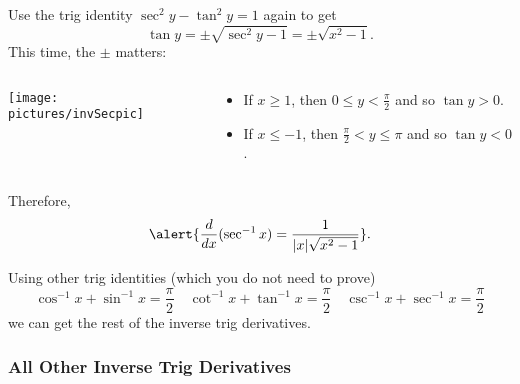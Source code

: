 \documentclass[cal1spr16Lectures.tex]{subfiles}
\begin{document}
\begin{frame}\footnotesize
Use the trig identity $\sec^2 y-\tan^2 y=1$ again to get 
\[\tan y=\pm\sqrt{\sec^2 y-1}=\pm\sqrt{x^2-1}.\]
This time, the $\pm$ matters:
\vspace{-1.1pc}
\begin{columns}
\begin{column}{0.3\textwidth}
	\begin{center}\texttt{[image: pictures/invSecpic]}\end{center}
\end{column}
\begin{column}{0.6\textwidth}
	\begin{itemize}
	\item If $x \ge 1$, then $0\leq y<\textstyle\frac{\pi}{2}$ and so $\tan y >0.$  
	\item If $x \le -1$, then $\textstyle\frac{\pi}{2} < y \leq \pi$ and so  $\tan y <0$.  
	\end{itemize}
\end{column}
\end{columns}	
\end{frame}

\begin{frame}\footnotesize
Therefore,
\[\alert{\frac{d}{dx}(\sec^{-1} x)=\frac{1}{|x|\sqrt{x^2-1}}}.\]
\hrulefill

Using other trig identities (which you do not need to prove)
\[\cos^{-1}x+\sin^{-1}x=\frac{\pi}{2}\quad \cot^{-1}x+\tan^{-1}x=\frac{\pi}{2}\quad \csc^{-1}x+\sec^{-1}x=\frac{\pi}{2}\] 
we can get the rest of the inverse trig derivatives. 
\end{frame}

\subsubsection{All Other Inverse Trig Derivatives}
\end{document}
